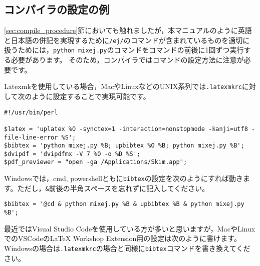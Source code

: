 \documentclass[10pt, a4paper, dvipdfmx, uplatex]{jsarticle} %
\begin{document}
\subsection{コンパイラの設定の例}
\label{sec:compile_config}

\ref{sec:compile_procedure}節においても触れましたが，本マニュアルのように英語と日本語の併記を実現するために\texttt{/ej/}のコマンドが含まれているものを適切に扱うためには，\texttt{python mixej.py}のコマンドを\BibTeX コマンドの前後に1回ずつ実行する必要があります。
そのため，コンパイラでは\BibTeX コマンドの設定方法に注意が必要です。

Latexmkを使用している場合，MacやLinuxなどのUNIX系列では\texttt{.latexmkrc}に対して次のように設定することで実現可能です。

\noindent\makebox[\linewidth]{\rule{\linewidth}{0.4pt}}\vspace{-0.5zw}
\begin{lstlisting}[style=onecol]
#!/usr/bin/perl

$latex = 'uplatex %O -synctex=1 -interaction=nonstopmode -kanji=utf8 -file-line-error %S';
$bibtex = 'python mixej.py %B; upbibtex %O %B; python mixej.py %B';
$dvipdf = 'dvipdfmx -V 7 %O -o %D %S';
$pdf_previewer = "open -ga /Applications/Skim.app";
\end{lstlisting}\vspace{-1.8zw}
\noindent\makebox[\linewidth]{\rule{\linewidth}{0.4pt}}\vspace{0.5zw}\par

\noindent
Windowsでは，cmd, powershellともに\texttt{bibtex}の設定を次のようにすれば動きます。ただし，\texttt{\&}前後の半角スペースを忘れずに記入してください。

\noindent\makebox[\linewidth]{\rule{\linewidth}{0.4pt}}\vspace{-0.5zw}
\begin{lstlisting}[style=onecol]
$bibtex = '@cd & python mixej.py %B & upbibtex %B & python mixej.py %B';
\end{lstlisting}\vspace{-1.8zw}
\noindent\makebox[\linewidth]{\rule{\linewidth}{0.4pt}}\vspace{0.5zw}\par


最近ではVisual Studio Codeを使用している方が多いと思いますが，MacやLinuxでのVSCodeのLaTeX Workshop Extension用の設定は次のように書けます。Windowsの場合は\texttt{.latexmkrc}の場合と同様に\texttt{bibtex}コマンドを書き換えてください。
\end{document}

